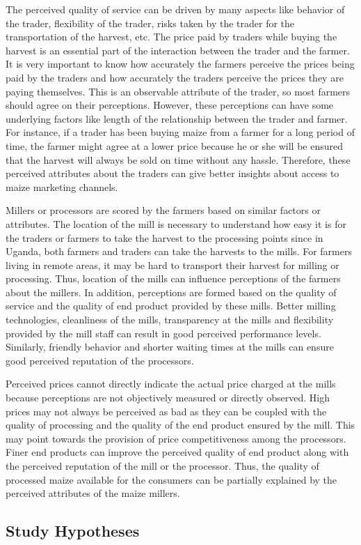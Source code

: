 \documentclass[12pt,english]{article}\usepackage[]{graphicx}\usepackage[]{color}
\begin{document}
\begin{onehalfspace}
The perceived quality of service can be driven by many aspects like
behavior of the trader, flexibility of the trader, risks taken by
the trader for the transportation of the harvest, etc. The price paid
by traders while buying the harvest is an essential part of the interaction
between the trader and the farmer. It is very important to know how
accurately the farmers perceive the prices being paid by the traders
and how accurately the traders perceive the prices they are paying
themselves. This is an observable attribute of the trader, so most
farmers should agree on their perceptions. However, these perceptions
can have some underlying factors like length of the relationship between
the trader and farmer. For instance, if a trader has been buying maize
from a farmer for a long period of time, the farmer might agree at
a lower price because he or she will be ensured that the harvest will
always be sold on time without any hassle. Therefore, these perceived
attributes about the traders can give better insights about access
to maize marketing channels. 

Millers or processors are scored by the farmers based on similar factors
or attributes. The location of the mill is necessary to understand
how easy it is for the traders or farmers to take the harvest to the
processing points since in Uganda, both farmers and traders can take
the harvests to the mills. For farmers living in remote areas, it
may be hard to transport their harvest for milling or processing.
Thus, location of the mills can influence perceptions of the farmers
about the millers. In addition, perceptions are formed based on the
quality of service and the quality of end product provided by these
mills. Better milling technologies, cleanliness of the mills, transparency
at the mills and flexibility provided by the mill staff can result
in good perceived performance levels. Similarly, friendly behavior
and shorter waiting times at the mills can ensure good perceived reputation
of the processors.

Perceived prices cannot directly indicate the actual price charged
at the mills because perceptions are not objectively measured or directly
observed. High prices may not always be perceived as bad as they can
be coupled with the quality of processing and the quality of the end
product ensured by the mill. This may point towards the provision
of price competitiveness among the processors. Finer end products
can improve the perceived quality of end product along with the perceived
reputation of the mill or the processor. Thus, the quality of processed
maize available for the consumers can be partially explained by the
perceived attributes of the maize millers. 

\newpage{}
\end{onehalfspace}
\begin{singlespace}

\section{Study Hypotheses\label{sec:Study-Hypotheses}}
\end{singlespace}
\end{document}
